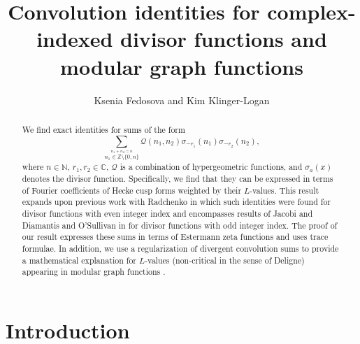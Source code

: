 \documentclass[]{article}
\title{Convolution identities for complex-indexed divisor functions and modular graph functions}
\author{Ksenia Fedosova and Kim Klinger-Logan}
\begin{document}
\date{}


\maketitle

\begin{abstract}
We find exact identities for sums of the form 
\begin{equation*}\label{eq:convsumabs}
  \sum_{\stackrel{n_1+n_2 = n}{n_1 \in \mathbb{Z} \setminus \{ 0, n \} }}  \mathcal{Q}(n_1,n_2)  \sigma_{-r_1}(n_1) \sigma_{-r_2}(n_2),
  \end{equation*}
  where $n\in\mathbb{N}$, $r_1,r_2\in\mathbb{C}$, $\mathcal{Q}$ is a combination of hypergeometric functions, and $\sigma_{a}(x)$ denotes the divisor function.  Specifically,  
  we find that they can be expressed in terms of Fourier coefficients of Hecke cusp forms weighted by their $L$-values.   This result expands upon previous work with Radchenko in which such identities were found for divisor functions with  even integer index \cite{FKLR} and encompasses  results of Jacobi \cite{motohashi1994binary} and Diamantis and O'Sullivan in \cite{diamantis2010kernels, o2023identities} for divisor functions with odd integer index. The proof of our result expresses these sums in terms of Estermann zeta functions and uses trace formulae. In addition, we use a regularization of divergent convolution sums  to provide a mathematical explanation for $L$-values (non-critical in the sense of Deligne) appearing in modular graph functions  \cite{DKS2021_2}.  
\end{abstract}






  
\section{Introduction}
\end{document}
